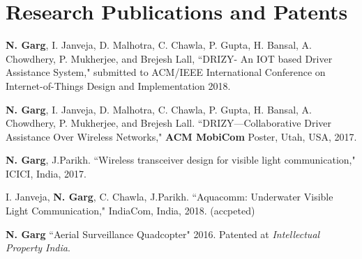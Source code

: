 \section{Research Publications and Patents}
\begin{bibsection}
    \item \textbf{N. Garg}, I. Janveja, D. Malhotra, C. Chawla, P. Gupta, H. Bansal, A. Chowdhery, P. Mukherjee, and Brejesh Lall, ``DRIZY- An IOT based Driver Assistance System," submitted to ACM/IEEE International Conference on Internet-of-Things Design and Implementation 2018.
    \item \textbf{N. Garg}, I. Janveja, D. Malhotra, C. Chawla, P. Gupta, H. Bansal, A. Chowdhery, P. Mukherjee, and Brejesh Lall. ``DRIZY---Collaborative Driver Assistance Over Wireless Networks," \textbf{ACM MobiCom} Poster, Utah, USA, 2017.
    \item \textbf{N. Garg}, J.Parikh. ``Wireless transceiver design for visible light communication," ICICI, India, 2017.
    \item I. Janveja, \textbf{N. Garg}, C. Chawla, J.Parikh. ``Aquacomm: Underwater Visible Light Communication," IndiaCom, India, 2018. (accpeted)
    \item \textbf{N. Garg} ``Aerial Surveillance Quadcopter" 2016. Patented at \emph{Intellectual Property India}.
\end{bibsection}

